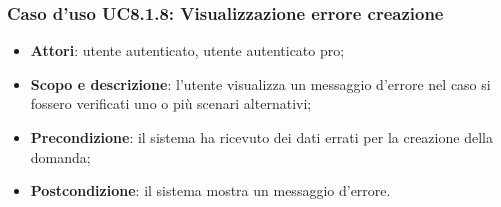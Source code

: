 	\subsubsection{Caso d'uso UC8.1.8: Visualizzazione errore creazione}
	\begin{itemize}
		\item
			\textbf{Attori}: utente autenticato, utente autenticato pro;
		\item
			\textbf{Scopo e descrizione}: l'utente visualizza un messaggio d'errore nel caso si fossero verificati uno o più scenari alternativi;
		\item		
			\textbf{Precondizione}: il sistema ha ricevuto dei dati errati per la creazione della domanda;
		\item
			\textbf{Postcondizione}: il sistema mostra un messaggio d'errore.
	\end{itemize}	
